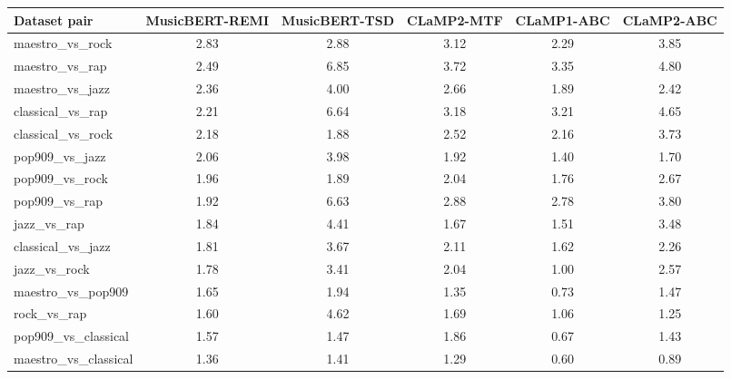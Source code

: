 \begin{tabular}{@{}lccccc@{}}
\toprule
Dataset pair & MusicBERT-REMI & MusicBERT-TSD & CLaMP2-MTF & CLaMP1-ABC & CLaMP2-ABC \\
\midrule
maestro\_vs\_rock & 2.83 & 2.88 & 3.12 & 2.29 & 3.85 \\
maestro\_vs\_rap & 2.49 & 6.85 & 3.72 & 3.35 & 4.80 \\
maestro\_vs\_jazz & 2.36 & 4.00 & 2.66 & 1.89 & 2.42 \\
classical\_vs\_rap & 2.21 & 6.64 & 3.18 & 3.21 & 4.65 \\
classical\_vs\_rock & 2.18 & 1.88 & 2.52 & 2.16 & 3.73 \\
pop909\_vs\_jazz & 2.06 & 3.98 & 1.92 & 1.40 & 1.70 \\
pop909\_vs\_rock & 1.96 & 1.89 & 2.04 & 1.76 & 2.67 \\
pop909\_vs\_rap & 1.92 & 6.63 & 2.88 & 2.78 & 3.80 \\
jazz\_vs\_rap & 1.84 & 4.41 & 1.67 & 1.51 & 3.48 \\
classical\_vs\_jazz & 1.81 & 3.67 & 2.11 & 1.62 & 2.26 \\
jazz\_vs\_rock & 1.78 & 3.41 & 2.04 & 1.00 & 2.57 \\
maestro\_vs\_pop909 & 1.65 & 1.94 & 1.35 & 0.73 & 1.47 \\
rock\_vs\_rap & 1.60 & 4.62 & 1.69 & 1.06 & 1.25 \\
pop909\_vs\_classical & 1.57 & 1.47 & 1.86 & 0.67 & 1.43 \\
maestro\_vs\_classical & 1.36 & 1.41 & 1.29 & 0.60 & 0.89 \\
\bottomrule
\end{tabular}